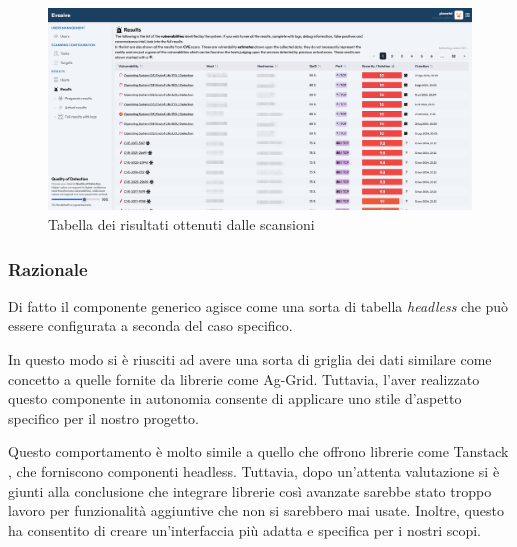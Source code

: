 \begin{figure}
\centering
\includegraphics[width=\textwidth]{img/results.png}
\caption{Tabella dei risultati ottenuti dalle scansioni}
\end{figure}

\subsubsection{Razionale}
Di fatto il componente generico agisce come una sorta di tabella \emph{headless} che può essere configurata a seconda del caso specifico.

In questo modo si è riusciti ad avere una sorta di griglia dei dati similare come concetto a quelle fornite da librerie come Ag-Grid. Tuttavia, l'aver realizzato questo componente in autonomia consente di applicare uno stile d'aspetto specifico per il nostro progetto.

Questo comportamento è molto simile a quello che offrono librerie come Tanstack \cite{tanstack}, che forniscono componenti headless. Tuttavia, dopo un'attenta valutazione si è giunti alla conclusione che integrare librerie così avanzate sarebbe stato troppo lavoro per funzionalità aggiuntive che non si sarebbero mai usate. Inoltre, questo ha consentito di creare un'interfaccia più adatta e specifica per i nostri scopi.


